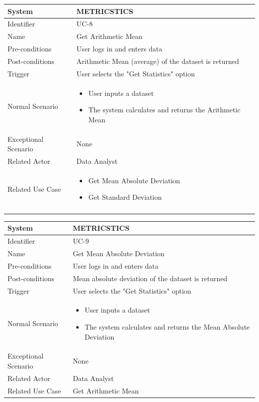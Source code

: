 \documentclass[letterpaper,12pt]{article}
\begin{document}
\begin{itemize}
\begin{tabular}{|p{1.45in}|p{3.65in}|}
    \hline
    System & METRICSTICS \\
    \hline
    Identifier & UC-8 \\
    \hline
    Name & Get Arithmetic Mean \\
    \hline
    Pre-conditions & User logs in and enters data\\
   \hline
    Post-conditions & Arithmetic Mean (average) of the dataset is returned\\
   \hline
    Trigger & User selects the "Get Statistics" option \\
    \hline
    Normal Scenario &  \begin{itemize}
   \item User inputs a dataset
   \item The system calculates and returns the Arithmetic Mean
   \end{itemize}\\
    \hline
    Exceptional Scenario & None \\
    \hline
    Related Actor& Data Analyst\\
    \hline
    Related Use Case & \begin{itemize}
   \item Get Mean Absolute Deviation
   \item Get Standard Deviation
   \end{itemize}\\\\
\hline
\end{tabular}
\bigskip
\bigskip

\begin{tabular}{|p{1.45in}|p{3.65in}|}
    \hline
    System & METRICSTICS \\
    \hline
    Identifier & UC-9 \\
    \hline
    Name &  Get Mean Absolute Deviation \\
    \hline
    Pre-conditions & User logs in and enters data\\
   \hline
    Post-conditions & Mean absolute deviation of the dataset is returned\\
   \hline
    Trigger & User selects the "Get Statistics" option \\
    \hline
    Normal Scenario &  \begin{itemize}
   \item User inputs a dataset
   \item The system calculates and returns the Mean Absolute Deviation
   \end{itemize}\\
    \hline
    Exceptional Scenario & None \\
    \hline
    Related Actor& Data Analyst\\
    \hline
    Related Use Case & Get Arithmetic Mean \\
\hline
\end{tabular}
\bigskip
\bigskip


\end{itemize}
\end{document}
